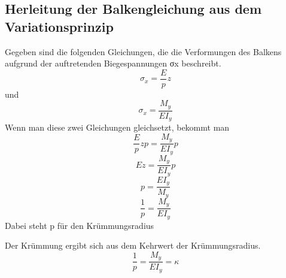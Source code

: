 \subsection{Herleitung der Balkengleichung aus dem Variationsprinzip}
Gegeben sind die folgenden Gleichungen, die die Verformungen des Balkens aufgrund der auftretenden Biegespannungen σx beschreibt.
\begin{equation}
	\sigma_x=
	\frac{E}{p}z
\end{equation}
und
\begin{equation}
	\sigma_x=
	\frac{M_y}{EI_y}
\end{equation}
Wenn man diese zwei Gleichungen gleichsetzt, bekommt man
\begin{equation}
	\frac{E}{p}zp
	=\frac{M_y}{EI_y}p
\end{equation}
\begin{equation}
	Ez=
	\frac{M_y}{EI_y}p
\end{equation}
\begin{equation}
	p=
	\frac{EI_y}{M_y}
\end{equation}
\begin{equation}
	\frac{1}{p}=
	\frac{M_y}{EI_y}
\end{equation}
Dabei steht p für den Krümmungsradius

Der Krümmung ergibt sich aus dem Kehrwert der Krümmungsradius.
\begin{equation}
	\frac{1}{p}=
	\frac{M_y}{EI_y}=
	\kappa
\end{equation}

